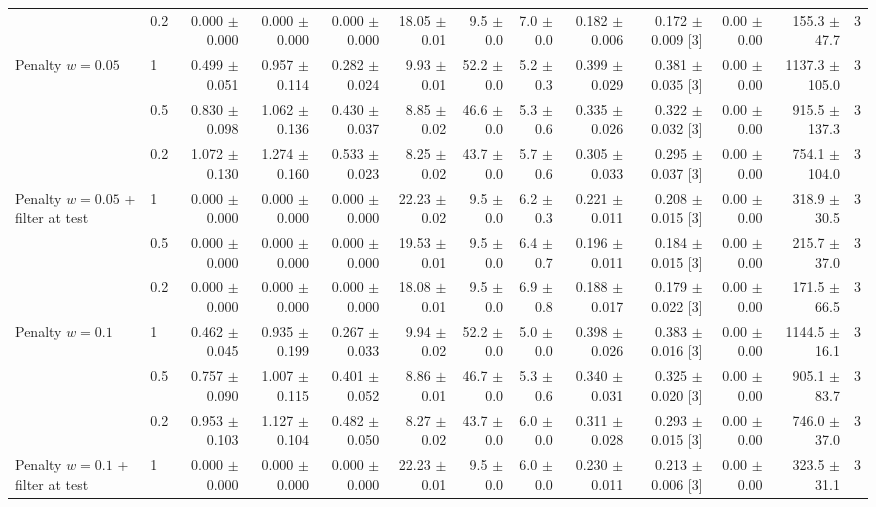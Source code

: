 {\begin{tabular}{llrrrrrrrrrrr}
 & 0.2 & 0.000 $\pm$ 0.000 & 0.000 $\pm$ 0.000 & 0.000 $\pm$ 0.000 & 18.05 $\pm$ 0.01 & 9.5 $\pm$ 0.0 & 7.0 $\pm$ 0.0 & 0.182 $\pm$ 0.006 & 0.172 $\pm$ 0.009 [3] & 0.00 $\pm$ 0.00 & 155.3 $\pm$ 47.7 & 3 \\
\addlinespace
Penalty $w{=}0.05$ & 1 & 0.499 $\pm$ 0.051 & 0.957 $\pm$ 0.114 & 0.282 $\pm$ 0.024 & 9.93 $\pm$ 0.01 & 52.2 $\pm$ 0.0 & 5.2 $\pm$ 0.3 & 0.399 $\pm$ 0.029 & 0.381 $\pm$ 0.035 [3] & 0.00 $\pm$ 0.00 & 1137.3 $\pm$ 105.0 & 3 \\
 & 0.5 & 0.830 $\pm$ 0.098 & 1.062 $\pm$ 0.136 & 0.430 $\pm$ 0.037 & 8.85 $\pm$ 0.02 & 46.6 $\pm$ 0.0 & 5.3 $\pm$ 0.6 & 0.335 $\pm$ 0.026 & 0.322 $\pm$ 0.032 [3] & 0.00 $\pm$ 0.00 & 915.5 $\pm$ 137.3 & 3 \\
 & 0.2 & 1.072 $\pm$ 0.130 & 1.274 $\pm$ 0.160 & 0.533 $\pm$ 0.023 & 8.25 $\pm$ 0.02 & 43.7 $\pm$ 0.0 & 5.7 $\pm$ 0.6 & 0.305 $\pm$ 0.033 & 0.295 $\pm$ 0.037 [3] & 0.00 $\pm$ 0.00 & 754.1 $\pm$ 104.0 & 3 \\
\addlinespace
Penalty $w{=}0.05$ + filter at test & 1 & 0.000 $\pm$ 0.000 & 0.000 $\pm$ 0.000 & 0.000 $\pm$ 0.000 & 22.23 $\pm$ 0.02 & 9.5 $\pm$ 0.0 & 6.2 $\pm$ 0.3 & 0.221 $\pm$ 0.011 & 0.208 $\pm$ 0.015 [3] & 0.00 $\pm$ 0.00 & 318.9 $\pm$ 30.5 & 3 \\
 & 0.5 & 0.000 $\pm$ 0.000 & 0.000 $\pm$ 0.000 & 0.000 $\pm$ 0.000 & 19.53 $\pm$ 0.01 & 9.5 $\pm$ 0.0 & 6.4 $\pm$ 0.7 & 0.196 $\pm$ 0.011 & 0.184 $\pm$ 0.015 [3] & 0.00 $\pm$ 0.00 & 215.7 $\pm$ 37.0 & 3 \\
 & 0.2 & 0.000 $\pm$ 0.000 & 0.000 $\pm$ 0.000 & 0.000 $\pm$ 0.000 & 18.08 $\pm$ 0.01 & 9.5 $\pm$ 0.0 & 6.9 $\pm$ 0.8 & 0.188 $\pm$ 0.017 & 0.179 $\pm$ 0.022 [3] & 0.00 $\pm$ 0.00 & 171.5 $\pm$ 66.5 & 3 \\
\addlinespace
Penalty $w{=}0.1$ & 1 & 0.462 $\pm$ 0.045 & 0.935 $\pm$ 0.199 & 0.267 $\pm$ 0.033 & 9.94 $\pm$ 0.02 & 52.2 $\pm$ 0.0 & 5.0 $\pm$ 0.0 & 0.398 $\pm$ 0.026 & 0.383 $\pm$ 0.016 [3] & 0.00 $\pm$ 0.00 & 1144.5 $\pm$ 16.1 & 3 \\
 & 0.5 & 0.757 $\pm$ 0.090 & 1.007 $\pm$ 0.115 & 0.401 $\pm$ 0.052 & 8.86 $\pm$ 0.01 & 46.7 $\pm$ 0.0 & 5.3 $\pm$ 0.6 & 0.340 $\pm$ 0.031 & 0.325 $\pm$ 0.020 [3] & 0.00 $\pm$ 0.00 & 905.1 $\pm$ 83.7 & 3 \\
 & 0.2 & 0.953 $\pm$ 0.103 & 1.127 $\pm$ 0.104 & 0.482 $\pm$ 0.050 & 8.27 $\pm$ 0.02 & 43.7 $\pm$ 0.0 & 6.0 $\pm$ 0.0 & 0.311 $\pm$ 0.028 & 0.293 $\pm$ 0.015 [3] & 0.00 $\pm$ 0.00 & 746.0 $\pm$ 37.0 & 3 \\
\addlinespace
Penalty $w{=}0.1$ + filter at test & 1 & 0.000 $\pm$ 0.000 & 0.000 $\pm$ 0.000 & 0.000 $\pm$ 0.000 & 22.23 $\pm$ 0.01 & 9.5 $\pm$ 0.0 & 6.0 $\pm$ 0.0 & 0.230 $\pm$ 0.011 & 0.213 $\pm$ 0.006 [3] & 0.00 $\pm$ 0.00 & 323.5 $\pm$ 31.1 & 3 \\

\end{tabular}}
